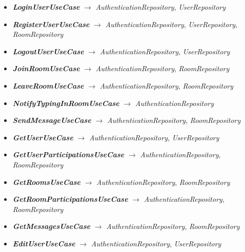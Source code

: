 \begin{itemize}
    \item \textit{\textbf{LoginUserUseCase}} $\longrightarrow$ \textit{AuthenticationRepository}, \textit{UserRepository}
    
    \item \textit{\textbf{RegisterUserUseCase}} $\longrightarrow$ \textit{AuthenticationRepository}, \textit{UserRepository}, \textit{RoomRepository}
    
    \item \textit{\textbf{LogoutUserUseCase}} $\longrightarrow$ \textit{AuthenticationRepository}, \textit{UserRepository}
    
    \item \textit{\textbf{JoinRoomUseCase}} $\longrightarrow$ \textit{AuthenticationRepository}, \textit{RoomRepository}
    
    \item \textit{\textbf{LeaveRoomUseCase}} $\longrightarrow$ \textit{AuthenticationRepository}, \textit{RoomRepository}
    
    \item \textit{\textbf{NotifyTypingInRoomUseCase}} $\longrightarrow$ \textit{AuthenticationRepository}
    
    \item \textit{\textbf{SendMessageUseCase}} $\longrightarrow$ \textit{AuthenticationRepository}, \textit{RoomRepository}
    
    \item \textit{\textbf{GetUserUseCase}} $\longrightarrow$ \textit{AuthenticationRepository}, \textit{UserRepository}
    
    \item \textit{\textbf{GetUserParticipationsUseCase}} $\longrightarrow$ \textit{AuthenticationRepository}, \textit{RoomRepository}
    
    \item \textit{\textbf{GetRoomsUseCase}} $\longrightarrow$ \textit{AuthenticationRepository}, \textit{RoomRepository}
    
    \item \textit{\textbf{GetRoomParticipationsUseCase}} $\longrightarrow$ \textit{AuthenticationRepository}, \textit{RoomRepository}
    
    \item \textit{\textbf{GetMessagesUseCase}} $\longrightarrow$ \textit{AuthenticationRepository}, \textit{RoomRepository}
    
    \item \textit{\textbf{EditUserUseCase}} $\longrightarrow$ \textit{AuthenticationRepository}, \textit{UserRepository}
    

\end{itemize}
